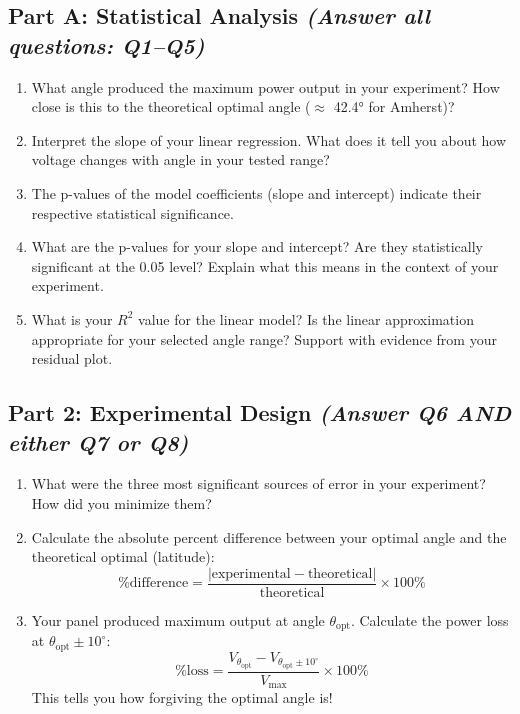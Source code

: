 \documentclass[11pt,twoside]{article}
\numberwithin{equation}{section}
\newcommand{\?}{\stackrel{?}{=}}
\begin{document}
\subsection{Part A: Statistical Analysis {\it (Answer all questions: Q1--Q5)} }
\begin{enumerate}

\item What angle produced the maximum power output in your experiment? How close is this to the theoretical optimal angle ($\approx$ 42.4° for Amherst)?

\item Interpret the slope of your linear regression. What does it tell you about how voltage changes with angle in your tested range?

\item The p-values of the model coefficients (slope and intercept) indicate their respective statistical significance.
\item What are the p-values for your slope and intercept? Are they statistically significant at the 0.05 level? Explain what this means in the context of your experiment.

\item What is your $R^2$ value for the linear model? Is the linear approximation appropriate for your selected angle range? Support with evidence from your residual plot.


\end{enumerate}
\subsection{Part 2: Experimental Design {\it (Answer Q6 AND either Q7 or Q8)} }
\begin{enumerate}[resume]
\item What were the three most significant sources of error in your experiment? How did you minimize them?

\item Calculate the absolute percent difference between your optimal angle and the theoretical optimal (latitude):
\[\text{\% difference} = \frac{|\text{experimental} - \text{theoretical}|}{\text{theoretical}} \times 100\%\]

\item Your panel produced maximum output at angle $\theta_{\text{opt}}$. Calculate the power loss 
at $\theta_{\text{opt}} \pm 10^{\circ}$:
\[\text{\% loss} = \frac{V_{\theta_{\text{opt}}} - V_{\theta_{\text{opt}} \pm 10^{\circ}}}{V_{\text{max}}} \times 100\%\]
This tells you how forgiving the optimal angle is!

\end{enumerate}
\end{document}
